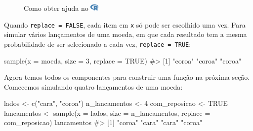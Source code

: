 \documentclass[
  letterpaper,
]{book}
\newenvironment{Shaded}{\begin{snugshade}}{\end{snugshade}}
\newcommand{\AttributeTok}[1]{\textcolor[rgb]{0.40,0.45,0.13}{#1}}
\newcommand{\CommentTok}[1]{\textcolor[rgb]{0.37,0.37,0.37}{#1}}
\newcommand{\ConstantTok}[1]{\textcolor[rgb]{0.56,0.35,0.01}{#1}}
\newcommand{\DecValTok}[1]{\textcolor[rgb]{0.68,0.00,0.00}{#1}}
\newcommand{\FunctionTok}[1]{\textcolor[rgb]{0.28,0.35,0.67}{#1}}
\newcommand{\NormalTok}[1]{\textcolor[rgb]{0.00,0.23,0.31}{#1}}
\newcommand{\OtherTok}[1]{\textcolor[rgb]{0.00,0.23,0.31}{#1}}
\newcommand{\StringTok}[1]{\textcolor[rgb]{0.13,0.47,0.30}{#1}}
\theoremstyle{definition}
\theoremstyle{plain}
\theoremstyle{remark}
\begin{document}
\begin{figure}


\caption{\label{fig-help-sample-replace}Como obter ajuda no
\includegraphics[width=1.13em,height=1em]{getting_started_with_r_files/figure-pdf/fa-icon-9b00320707d42527dde67262afb33ded.pdf}}

\end{figure}%

Quando \texttt{replace\ =\ FALSE}, cada item em \texttt{x} só pode ser
escolhido uma vez. Para simular vários lançamentos de uma moeda, em que
cada resultado tem a mesma probabilidade de ser selecionado a cada vez,
\texttt{replace\ =\ TRUE}:

\begin{Shaded}
\begin{Highlighting}[]
\FunctionTok{sample}\NormalTok{(}\AttributeTok{x =}\NormalTok{ moeda, }\AttributeTok{size =} \DecValTok{3}\NormalTok{, }\AttributeTok{replace =} \ConstantTok{TRUE}\NormalTok{)}
\CommentTok{\#\textgreater{} [1] "coroa" "coroa" "coroa"}
\end{Highlighting}
\end{Shaded}

Agora temos todos os componentes para construir uma função na próxima
seção. Comecemos simulando quatro lançamentos de uma moeda:

\begin{Shaded}
\begin{Highlighting}[]
\NormalTok{lados }\OtherTok{\textless{}{-}} \FunctionTok{c}\NormalTok{(}\StringTok{"cara"}\NormalTok{, }\StringTok{"coroa"}\NormalTok{)}
\NormalTok{n\_lancamentos }\OtherTok{\textless{}{-}} \DecValTok{4}
\NormalTok{com\_reposicao }\OtherTok{\textless{}{-}} \ConstantTok{TRUE}
\NormalTok{lancamentos }\OtherTok{\textless{}{-}} \FunctionTok{sample}\NormalTok{(}\AttributeTok{x =}\NormalTok{ lados, }
                      \AttributeTok{size =}\NormalTok{ n\_lancamentos, }
                      \AttributeTok{replace =}\NormalTok{ com\_reposicao)}
\NormalTok{lancamentos}
\CommentTok{\#\textgreater{} [1] "coroa" "cara"  "cara"  "coroa"}
\end{Highlighting}
\end{Shaded}
\end{document}
